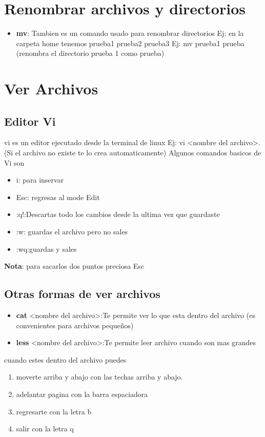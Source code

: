 \documentclass[12pt,a4paper]{article}
\begin{document}
\section{Renombrar archivos y directorios}
\begin{itemize}
\item \textbf{mv}: Tambien es un comando usado para renombrar directorios Ej: en la carpeta home tenemos prueba1 prueba2 prueba3 Ej: mv prueba1 prueba (renombra el directorio prueba 1 como  prueba)
\end{itemize}

\section{Ver Archivos}
\subsection{Editor Vi}
vi es un editor ejecutado desde la terminal de linux Ej: vi <nombre del archivo>. (Si el archivo no existe te lo crea automaticamente)
Algunos comandos basicos de Vi son
\begin{itemize}
\item i: para inservar
\item Esc: regresas al mode Edit
\item :q!:Descartas todo los cambios desde la ultima vez que guardaste
\item :w: guardas el archivo pero no sales
\item :wq:guardas y sales
\end{itemize}
\textbf{Nota}: para sacarlos dos puntos preciosa Esc

\subsection{Otras formas de ver archivos}
\begin{itemize}
\item \textbf{cat} <nombre del archivo>:Te permite ver lo que esta dentro del archivo (es convenientes para archivos pequeños)
\item \textbf{less} <nombre del archivo>:Te permite leer archivo cuando son mas grandes
\end{itemize}
cuando estes dentro del archivo puedes
\begin{enumerate}
\item moverte arriba y abajo con las techas arriba y abajo.
\item adelantar pagina con la barra espaciadora
\item regresarte con la letra b
\item salir con la letra q
\end{enumerate}
\end{document}
